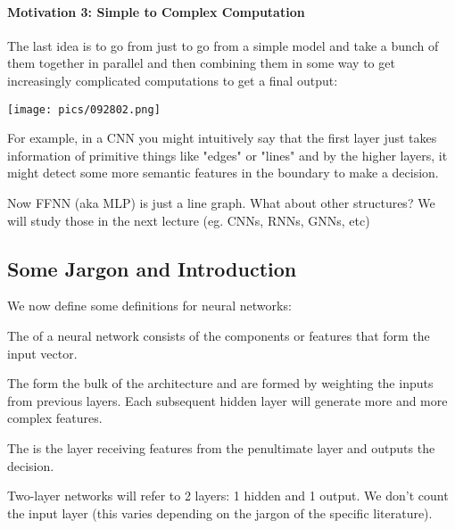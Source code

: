 \documentclass[11pt]{scrartcl}
\begin{document}
\paragraph{Motivation 3: Simple to Complex Computation}

The last idea is to go from just to go from a simple model and take a bunch of them together in parallel and then combining them in some way to get increasingly complicated computations to get a final output:
\begin{center}
    \texttt{[image: pics/092802.png]}
\end{center}
For example, in a CNN you might intuitively say that the first layer just takes information of primitive things like "edges" or "lines" and by the higher layers, it might detect some more semantic features in the boundary to make a decision.

Now FFNN (aka MLP) is just a line graph. What about other structures? We will study those in the next lecture (eg. CNNs, RNNs, GNNs, etc)

\subsection{Some Jargon and Introduction}
We now define some definitions for neural networks:
\begin{defn}
The  of a neural network consists of the components or features that form the input vector. 
\end{defn}

\newpage
\begin{defn}
The  form the bulk of the architecture and are formed by weighting the inputs from previous layers. Each subsequent hidden layer will generate more and more complex features. 
\end{defn}


\begin{defn}
The  is the layer receiving features from the penultimate layer and outputs the decision. 
\end{defn}

Two-layer networks will refer to 2 layers: 1 hidden and 1 output. We don't count the input layer (this varies depending on the jargon of the specific literature).
\end{document}
